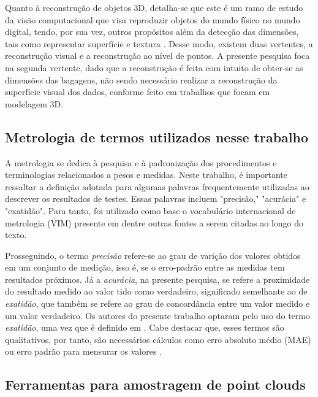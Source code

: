     Quanto à reconstrução de objetos 3D, detalha-se que este é um ramo de estudo da visão computacional que visa reproduzir objetos do mundo físico no mundo digital, tendo, por sua vez, outros propósitos além da detecção das dimensões, tais como representar superfície e textura \cite{warnett_2016_towards, chen_2013_research}. Desse modo, existem duas vertentes, a reconstrução visual e a reconstrução ao nível de pontos. A presente pesquisa foca na segunda vertente, dado que a reconstrução é feita com intuito de obter-se as dimensões das bagagens, não sendo necessário realizar a reconstrução da superfície visual dos dados, conforme feito em trabalhos que focam em modelagem 3D. 



\subsection{Metrologia de termos utilizados nesse trabalho}
\label{subsec_Metrologia de termos utilizados nesse trabalho}
    
    A metrologia se dedica à pesquisa e à padronização dos procedimentos e terminologias relacionados a pesos e medidas. Neste trabalho, é importante ressaltar a definição adotada para algumas palavras frequentemente utilizadas ao descrever os resultados de testes. Essas palavras incluem "precisão," "acurácia" e "exatidão". Para tanto, foi utilizado como base o vocabulário internacional de metrologia (VIM) presente em \cite{gov_2022_documentos} dentre outras fontes a serem citadas ao longo do texto.

    Prosseguindo, o termo \textit{precisão} refere-se ao grau de varição dos valores obtidos em um conjunto de medição, isso é, se o erro-padrão entre as medidas tem resultados próximos. Já a \textit{acurácia}, na presente pesquisa, se refere a proximidade do resultado medido ao valor tido como verdadeiro, significado semelhante ao de \textit{exatidão}, que também se refere ao grau de concordância entre um valor medido e um valor verdadeiro. Os autores do presente trabalho optaram pelo uso do termo \textit{exatidão}, uma vez que é definido em . Cabe destacar que, esses termos são qualitativos, por tanto, são necessários cálculos como erro absoluto médio (MAE) ou erro padrão para mensurar os valores \cite{gov_2022_documentos, zrhans_2018_acurcia}. 
    


\subsection{Ferramentas para amostragem de point clouds}
\label{sec_ferramentas para amostragem de point clouds}

